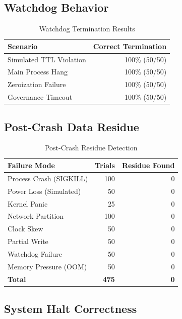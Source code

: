 \documentclass[conference]{IEEEtran}
\begin{document}
\subsection{Watchdog Behavior}

\begin{table}[h]
\caption{Watchdog Termination Results}
\centering
\begin{tabular}{l r}
\toprule
\textbf{Scenario} & \textbf{Correct Termination} \\
\midrule
Simulated TTL Violation & 100\% (50/50) \\
Main Process Hang & 100\% (50/50) \\
Zeroization Failure & 100\% (50/50) \\
Governance Timeout & 100\% (50/50) \\
\bottomrule
\end{tabular}
\label{tab:watchdog}
\end{table}

\subsection{Post-Crash Data Residue}

\begin{table}[h]
\caption{Post-Crash Residue Detection}
\centering
\begin{tabular}{l r r}
\toprule
\textbf{Failure Mode} & \textbf{Trials} & \textbf{Residue Found} \\
\midrule
Process Crash (SIGKILL) & 100 & 0 \\
Power Loss (Simulated) & 50 & 0 \\
Kernel Panic & 25 & 0 \\
Network Partition & 100 & 0 \\
Clock Skew & 50 & 0 \\
Partial Write & 50 & 0 \\
Watchdog Failure & 50 & 0 \\
Memory Pressure (OOM) & 50 & 0 \\
\textbf{Total} & \textbf{475} & \textbf{0} \\
\bottomrule
\end{tabular}
\label{tab:residue}
\end{table}

\subsection{System Halt Correctness}
\end{document}
